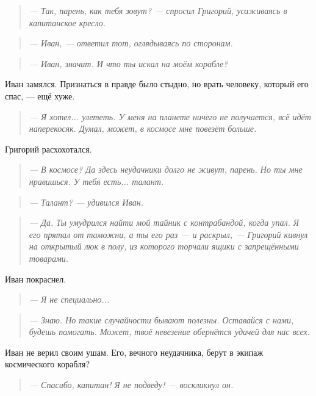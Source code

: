 \documentclass[12pt,a4paper]{book}
\newenvironment{dialogue}{\begin{quote}\itshape}{\end{quote}}
\begin{document}
\begin{dialogue}
--- Так, парень, как тебя зовут? --- спросил Григорий, усаживаясь в капитанское кресло.
\end{dialogue}

\begin{dialogue}
--- Иван, --- ответил тот, оглядываясь по сторонам.
\end{dialogue}

\begin{dialogue}
--- Иван, значит. И что ты искал на моём корабле?
\end{dialogue}

Иван замялся. Признаться в правде было стыдно, но врать человеку, который его спас, --- ещё хуже.

\begin{dialogue}
--- Я хотел... улететь. У меня на планете ничего не получается, всё идёт наперекосяк. Думал, может, в космосе мне повезёт больше.
\end{dialogue}

Григорий расхохотался.

\begin{dialogue}
--- В космосе? Да здесь неудачники долго не живут, парень. Но ты мне нравишься. У тебя есть... талант.
\end{dialogue}

\begin{dialogue}
--- Талант? --- удивился Иван.
\end{dialogue}

\begin{dialogue}
--- Да. Ты умудрился найти мой тайник с контрабандой, когда упал. Я его прятал от таможни, а ты его раз --- и раскрыл, --- Григорий кивнул на открытый люк в полу, из которого торчали ящики с запрещёнными товарами.
\end{dialogue}

Иван покраснел.

\begin{dialogue}
--- Я не специально...
\end{dialogue}

\begin{dialogue}
--- Знаю. Но такие случайности бывают полезны. Оставайся с нами, будешь помогать. Может, твоё невезение обернётся удачей для нас всех.
\end{dialogue}

Иван не верил своим ушам. Его, вечного неудачника, берут в экипаж космического корабля?

\begin{dialogue}
--- Спасибо, капитан! Я не подведу! --- воскликнул он.
\end{dialogue}
\end{document}
